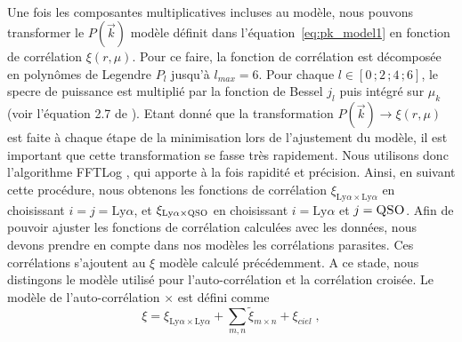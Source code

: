 \paragraph{}
Une fois les composantes multiplicatives incluses au modèle, nous pouvons transformer le $P(\vec k)$ modèle définit dans l'équation~\ref{eq:pk_model1} en fonction de corrélation $\xi(r, \mu)$.
Pour ce faire,
la fonction de corrélation est décomposée en polynômes de Legendre $P_l$ jusqu'à $l_{max} = 6$. Pour chaque $l \in [0 \, ; 2 \, ; 4\, ; 6]$,
le specre de puissance est multiplié par la fonction de Bessel $j_l$ puis intégré sur $\mu_k$ (voir l'équation 2.7 de \textcite{Kirkby2013}).
Etant donné que la transformation $P(\vec k) \rightarrow \xi(r, \mu)$ est faite à chaque étape de la minimisation lors de l'ajustement du modèle, il est important que cette transformation se fasse très rapidement. Nous utilisons donc l'algorithme FFTLog \autocite{Hamilton1999}, qui apporte à la fois rapidité et précision.
Ainsi, en suivant cette procédure, nous obtenons les fonctions de corrélation $\xi_{\mathrm{Ly}\alpha\times\mathrm{Ly}\alpha}$ en choisissant $i = j = \mathrm{Ly}\alpha$, et $\xi_{\mathrm{Ly}\alpha\times\textsc{QSO}}$ en choisissant $i = \mathrm{Ly}\alpha$ et $j = \textsc{QSO}$.
Afin de pouvoir ajuster les fonctions de corrélation calculées avec les données, nous devons prendre en compte dans nos modèles les corrélations parasites. Ces corrélations s'ajoutent au $\xi$ modèle calculé précédemment.
A ce stade, nous distingons le modèle utilisé pour l'auto-corrélation et la corrélation croisée.
Le modèle de l'auto-corrélation \lya{}$\times$\lya{} est défini comme
\begin{equation}
  \label{eq:cf_model1}
  \xi = \xi_{\mathrm{Ly}\alpha\times\mathrm{Ly}\alpha}  + \sum_{m, n} \tilde \xi_{m\times n} + \xi_{ciel}  \; ,
\end{equation}
